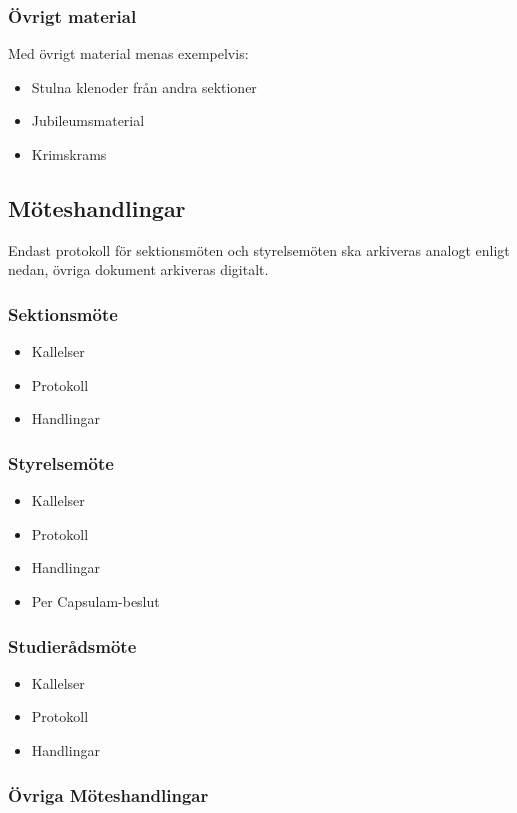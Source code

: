 \documentclass{dsekprotokoll}
\begin{document}
\subsubsection*{Övrigt material}
Med övrigt material menas exempelvis:
\begin{itemize}
  \item Stulna klenoder från andra sektioner
  \item Jubileumsmaterial
  \item Krimskrams
\end{itemize}

\subsection{Möteshandlingar}
Endast protokoll för sektionsmöten och styrelsemöten ska arkiveras
analogt enligt nedan, övriga dokument arkiveras digitalt.

\subsubsection*{Sektionsmöte}
\begin{itemize}
  \item Kallelser
  \item Protokoll
  \item Handlingar
\end{itemize}

\subsubsection*{Styrelsemöte}
\begin{itemize}
  \item Kallelser
  \item Protokoll
  \item Handlingar
  \item Per Capsulam-beslut
\end{itemize}

\subsubsection*{Studierådsmöte}
\begin{itemize}
  \item Kallelser
  \item Protokoll
  \item Handlingar
\end{itemize}

\subsubsection*{Övriga Möteshandlingar}
\end{document}
